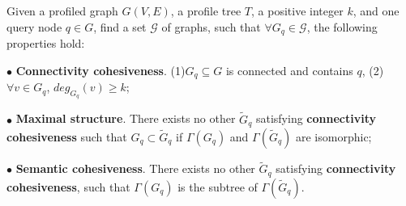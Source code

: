 \begin{problem}[PCQ]
\label{PCQ}
Given a profiled graph $G(V,E)$, a profile tree $T$, a positive integer $k$, and one query node $q\in G$, find a set $\mathcal {G}$ of graphs, such that $\forall G_q \in \mathcal {G}$, the following properties hold:

\vspace{1ex}

$\bullet$ \textbf{Connectivity cohesiveness}. (1)$G_q \subseteq G$ is connected and contains $q$, (2)$\forall v\in G_q$, $deg_{G_q}(v)\geq k$;

$\bullet$ \textbf{Maximal structure}. There exists no other $\tilde G_q$ satisfying \textbf {connectivity cohesiveness} such that $G_q \subset \tilde G_q$ if $\Gamma(G_q)$ and $\Gamma(\tilde G_q)$ are isomorphic;

$\bullet$ \textbf{Semantic cohesiveness}. There exists no other $\tilde G_q$ satisfying \textbf {connectivity cohesiveness}, such that $\Gamma(G_q)$ is the subtree of $\Gamma(\tilde G_q)$.

\end{problem}